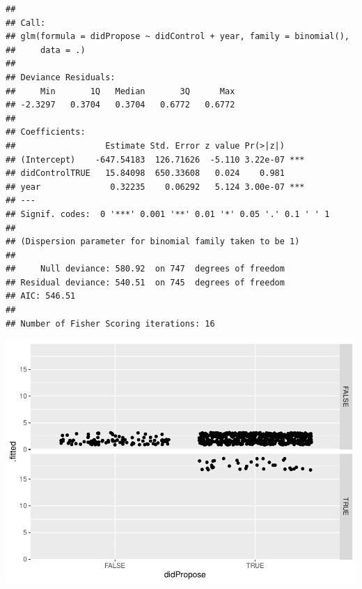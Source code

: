 \documentclass[]{article}
\newenvironment{Shaded}{\begin{snugshade}}{\end{snugshade}}
\newcommand{\DataTypeTok}[1]{\textcolor[rgb]{0.13,0.29,0.53}{#1}}
\newcommand{\KeywordTok}[1]{\textcolor[rgb]{0.13,0.29,0.53}{\textbf{#1}}}
\newcommand{\NormalTok}[1]{#1}
\newcommand{\OperatorTok}[1]{\textcolor[rgb]{0.81,0.36,0.00}{\textbf{#1}}}
\newcommand{\StringTok}[1]{\textcolor[rgb]{0.31,0.60,0.02}{#1}}
\begin{document}
\begin{Shaded}
\end{Shaded}

\begin{verbatim}
## 
## Call:
## glm(formula = didPropose ~ didControl + year, family = binomial(), 
##     data = .)
## 
## Deviance Residuals: 
##     Min       1Q   Median       3Q      Max  
## -2.3297   0.3704   0.3704   0.6772   0.6772  
## 
## Coefficients:
##                  Estimate Std. Error z value Pr(>|z|)    
## (Intercept)    -647.54183  126.71626  -5.110 3.22e-07 ***
## didControlTRUE   15.84098  650.33608   0.024    0.981    
## year              0.32235    0.06292   5.124 3.00e-07 ***
## ---
## Signif. codes:  0 '***' 0.001 '**' 0.01 '*' 0.05 '.' 0.1 ' ' 1
## 
## (Dispersion parameter for binomial family taken to be 1)
## 
##     Null deviance: 580.92  on 747  degrees of freedom
## Residual deviance: 540.51  on 745  degrees of freedom
## AIC: 546.51
## 
## Number of Fisher Scoring iterations: 16
\end{verbatim}

\begin{Shaded}
\end{Shaded}

\includegraphics{ProposalAnalysis_files/figure-latex/unnamed-chunk-8-2.pdf}
\end{document}
